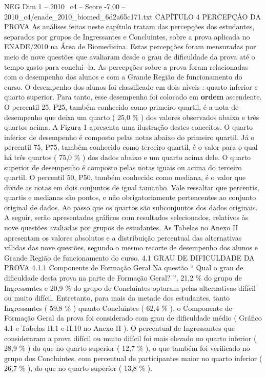 \begin{textsample}{NEG Dim 1 – 2010\_c4 – Score -7.00 – 2010\_c4/enade\_2010\_biomed\_6d2a65c171.txt}  \label{ex:f1_neg_035}
CAPÍTULO 4 PERCEPÇÃO DA PROVA As análises feitas neste capítulo tratam das percepções dos estudantes, separados por grupos de Ingressantes e Concluintes, sobre a prova aplicada no ENADE/2010 na Área de Biomedicina.
Estas percepções foram mensuradas por meio de nove questões que avaliaram desde o grau de dificuldade da prova até o tempo gasto para concluí -la.
As percepções sobre a prova foram relacionadas com o desempenho dos alunos e com a Grande Região de funcionamento do curso.
O desempenho dos alunos foi classificado em dois níveis : quarto inferior e quarto superior.
Para tanto, esse desempenho foi colocado em \textbf{ordem} ascendente.
O percentil 25, P25, também conhecido como primeiro quartil, é a nota de desempenho que deixa um quarto ( 25,0 \% ) dos valores observados abaixo e três quartos acima.
A Figura 1 apresenta uma ilustração destes conceitos.
O quarto inferior de desempenho é composto pelas notas abaixo do primeiro quartil.
Já o percentil 75, P75, também conhecido como terceiro quartil, é o valor para o qual há três quartos ( 75,0 \% ) dos dados abaixo e um quarto acima dele.
O quarto superior de desempenho é composto pelas notas iguais ou acima do terceiro quartil.
O percentil 50, P50, também conhecido como mediana, é o valor que divide as notas em dois conjuntos de igual tamanho.
Vale ressaltar que percentis, quartis e medianas são pontos, e não obrigatoriamente pertencentes ao conjunto original de dados.
Ao passo que os quartos são subconjuntos dos dados originais.
A seguir, serão apresentados gráficos com resultados selecionados, relativos às nove questões avaliadas por grupos de estudantes.
As Tabelas no Anexo II apresentam os valores absolutos e a distribuição percentual das alternativas válidas das nove questões, segundo o mesmo recorte de desempenho dos alunos e Grande Região de funcionamento do curso. 4.1 GRAU DE DIFICULDADE DA PROVA 4.1.1 Componente de Formação Geral Na questão “ Qual o grau de dificuldade desta prova na parte de Formação Geral? ”, 21,2 \% do grupo de Ingressantes e 20,9 \% do grupo de Concluintes optaram pelas alternativas difícil ou muito difícil.
Entretanto, para mais da metade dos estudantes, tanto Ingressantes ( 59,8 \% ) quanto Concluintes ( 62,4 \% ), o Componente de Formação Geral da prova foi considerado com grau de dificuldade médio ( Gráfico 4.1 e Tabelas II.1 e II.10 no Anexo II ).
O percentual de Ingressantes que consideraram a prova difícil ou muito difícil foi mais elevado no quarto inferior ( 28,9 \% ) do que no quarto superior ( 12,7 \% ), o que também foi verificado no grupo dos Concluintes, com percentual de participantes maior no quarto inferior ( 26,7 \% ), do que no quarto superior ( 13,8 \% ).

\end{textsample}
